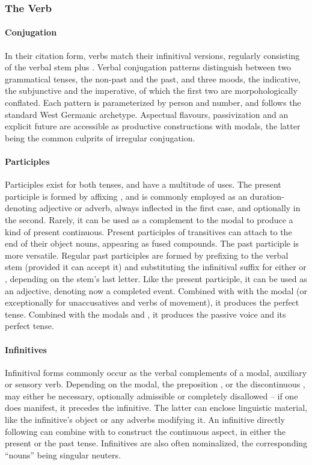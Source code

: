 \subsubsection{The Verb}
\paragraph{Conjugation}
In their citation form, verbs match their infinitival versions, regularly consisting of the verbal stem plus .
Verbal conjugation patterns distinguish between two grammatical tenses, the non-past and the past, and three moods, the indicative, the subjunctive and the imperative, of which the first two are morpohologically conflated.
Each pattern is parameterized by person and number, and follows the standard West Germanic archetype.
Aspectual flavours, passivization and an explicit future are accessible as productive constructions with modals, the latter being the common culprits of irregular conjugation.

\paragraph{Participles}
Participles exist for both tenses, and have a multitude of uses.
The present participle is formed by affixing , and is commonly employed as an duration-denoting adjective or adverb, always inflected in the first case, and optionally in the second.
Rarely, it can be used as a complement to the modal  to produce a kind of present continuous.
Present participles of transitives can attach to the end of their object nouns, appearing as fused compounds.
The past participle is more versatile.
Regular past participles are formed by prefixing  to the verbal stem (provided it can accept it) and substituting the infinitival suffix for either  or , depending on the stem's last letter.
Like the present participle, it can be used as an adjective, denoting now a completed event.
Combined with with the modal  (or exceptionally  for unaccusatives and verbs of movement), it produces the perfect tense.
Combined with the modals  and , it produces the passive voice and its perfect tense.

\paragraph{Infinitives}
Infinitival forms commonly occur as the verbal complements of a modal, auxiliary or sensory verb.
Depending on the modal, the preposition , or the discontinuous , may either be necessary, optionally admissible or completely disallowed -- if one does manifest, it precedes the infinitive.
The latter can enclose linguistic material, like the infinitive's object or any adverbs modifying it.
An infinitive directly following  can combine with  to construct the continuous aspect, in either the present or the past tense.
Infinitives are also often nominalized, the corresponding ``nouns'' being singular neuters.

